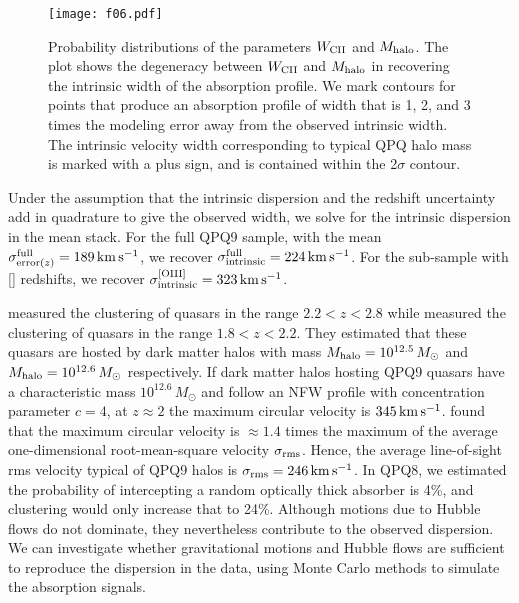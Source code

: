 \documentclass[iop]{emulateapj}
\begin{document}
\begin{figure}
\texttt{[image: f06.pdf]}
\caption{
Probability distributions of the parameters $W_{\rm CII}$ and $M_{\rm halo}$. The plot shows the
degeneracy between $W_{\rm CII}$ and $M_{\rm halo}$ in recovering the intrinsic width of the
absorption profile. We mark contours for points that produce an absorption
profile of width that is 1, 2, and 3 times the modeling error away from the observed intrinsic
width. The intrinsic velocity width corresponding to typical QPQ halo mass is marked with a plus
sign, and is contained within the 2$\sigma$ contour.}
\label{fig:contour}
\end{figure}

Under the assumption that the intrinsic dispersion and the redshift uncertainty add in
quadrature to give the observed width, we solve for the intrinsic dispersion in the 
mean stack. For the full QPQ9 sample, with the mean
$\sigma_{{\rm error}(z)}^{\rm full}=189\,{\rm km\,s^{-1}}$, we recover
$\sigma_{\rm intrinsic}^{\rm full}=224\,{\rm km\,s^{-1}}$. For the sub-sample with []
redshifts, we recover $\sigma_{\rm intrinsic}^{\rm [OIII]}=323\,{\rm km\,s^{-1}}$.

\cite{Eftekharzadeh+15} measured the clustering of quasars in the range $2.2<z<2.8$ while
\cite{RodriguezTorres+17} measured the clustering of quasars in the range $1.8<z<2.2$. They
estimated that these quasars are hosted by dark matter halos with mass
$M_{\rm halo}=10^{12.5}\,M_\odot$ and $M_{\rm halo}=10^{12.6}\,M_\odot$ respectively. If dark
matter halos hosting QPQ9 quasars have a characteristic mass $10^{12.6}\,M_\odot$ and follow an
NFW profile \citep{NavarroFrenkWhite97} with concentration parameter $c=4$, at $z\approx2$ the
maximum circular velocity is $345\,{\rm km\,s^{-1}}$. \cite{TormenBouchetWhite97} found that the
maximum circular velocity is $\approx1.4$ times the maximum of the average one-dimensional
root-mean-square velocity $\sigma_{\rm rms}$. Hence, the average line-of-sight rms velocity
typical of QPQ9 halos is $\sigma_{\rm rms}=246\,{\rm km\,s^{-1}}$. In QPQ8, we estimated the
probability of intercepting a random optically thick absorber is 4\%, and clustering would only
increase that to 24\%. Although motions due to Hubble flows do not dominate, they nevertheless
contribute to the observed dispersion. We can investigate
whether gravitational motions and Hubble flows are sufficient to reproduce the dispersion in the
data, using Monte Carlo methods to simulate the absorption signals.
\end{document}
